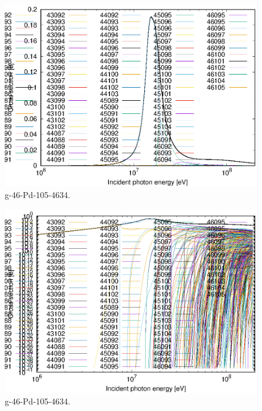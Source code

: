 \begin{figure}
 \includegraphics[width=\linewidth]{eps/g_46-Pd-105_4634.eps}
  \caption{g-46-Pd-105-4634.}
\end{figure}
\begin{figure}
 \includegraphics[width=\linewidth]{eps-log/g_46-Pd-105_4634.eps}
 \caption{g-46-Pd-105-4634.}
\end{figure}
\newpage \clearpage

